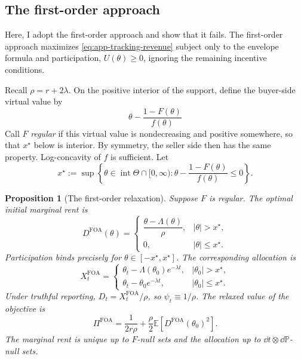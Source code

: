 \documentclass[12pt]{article}
\newtheorem{prop}{Proposition}
\newcommand{\E}{\mathbb{E}}
\begin{document}
\subsection{The first-order approach}\label{sub:app-foa}
Here, I adopt the first-order approach and show that it fails.
The first-order approach maximizes \eqref{eq:app-tracking-revenue}
subject only to the envelope formula and participation,
\(U(\theta)\geq0\), ignoring the remaining incentive conditions.

Recall \(\rho=r+2\lambda\). On the positive interior of the support,
define the buyer-side virtual value by
\[
  \theta-\frac{1-F(\theta)}{f(\theta)}
\]
Call \(F\) \emph{regular} if this virtual value is nondecreasing and
positive somewhere, so that \(x^\star\) below is interior. By symmetry,
the seller side then has the same property. Log-concavity of \(f\) is
sufficient. Let
\[
  x^\star
  :=
  \sup\left\{
    \theta\in\operatorname{int}\Theta\cap[0,\infty):
    \theta-\frac{1-F(\theta)}{f(\theta)}\leq0
  \right\}.
\]

\begin{prop}[The first-order relaxation]\label{prop:app-foa}
Suppose \(F\) is regular. The optimal initial marginal rent is
\begin{equation}\label{eq:app-foa}
  D^{\mathrm{FOA}}(\theta)
  =
  \begin{cases}
    \dfrac{\theta-\Lambda(\theta)}{\rho},
      & |\theta|>x^\star,\\[8pt]
    0, & |\theta|\leq x^\star.
  \end{cases}
\end{equation}
Participation binds precisely for
\(\theta\in[-x^\star,x^\star]\). The corresponding allocation is
\begin{equation}\label{eq:app-foa-X}
  X_t^{\mathrm{FOA}}
  =
  \begin{cases}
    \theta_t-\Lambda(\theta_0)e^{-\lambda t},
      & |\theta_0|>x^\star,\\[4pt]
    \theta_t-\theta_0e^{-\lambda t},
      & |\theta_0|\leq x^\star.
  \end{cases}
\end{equation}
Under truthful reporting, \(D_t=X_t^{\mathrm{FOA}}/\rho\), so
\(\psi_t\equiv1/\rho\). The relaxed value of the objective is
\begin{equation}\label{eq:app-foa-value}
  \Pi^{\mathrm{FOA}}
  =
  \frac{1}{2r\rho}
  +\frac{\rho}{2}
    \E\!\left[D^{\mathrm{FOA}}(\theta_0)^2\right].
\end{equation}
The marginal rent is unique up to \(F\)-null sets and the allocation up to
\(\dd t\otimes\dd\mathbb P\)-null sets.
\end{prop}
\end{document}
